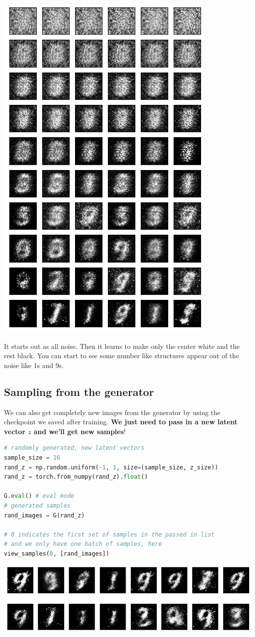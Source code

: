 \includegraphics{img/genAdvNet/gan/output_32_0.png}

It starts out as all noise. Then it learns to make only the center white
and the rest black. You can start to see some number like structures
appear out of the noise like 1s and 9s.

\subsection{Sampling from the generator}

We can also get completely new images from the generator by using the
checkpoint we saved after training. \textbf{We just need to pass in a
new latent vector \(z\) and we'll get new samples}!

\begin{lstlisting}[language=Python]
# randomly generated, new latent vectors
sample_size = 16
rand_z = np.random.uniform(-1, 1, size=(sample_size, z_size))
rand_z = torch.from_numpy(rand_z).float()

G.eval() # eval mode
# generated samples
rand_images = G(rand_z)

# 0 indicates the first set of samples in the passed in list
# and we only have one batch of samples, here
view_samples(0, [rand_images])
\end{lstlisting}

\includegraphics{img/genAdvNet/gan/output_35_0.png}
